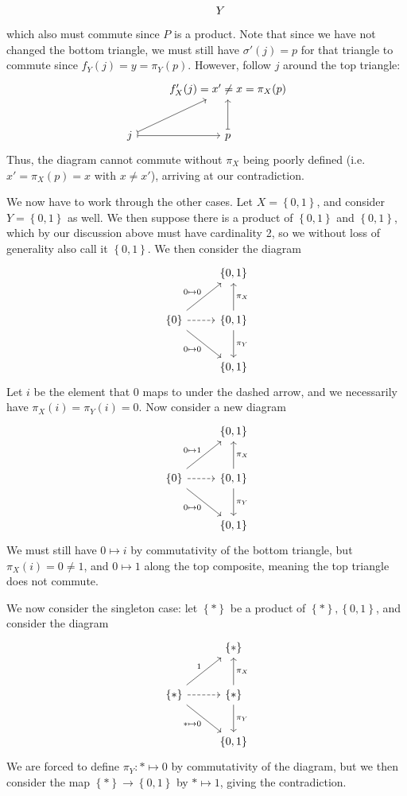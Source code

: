 \documentclass[11pt, letterpaper]{article}
\begin{document}
\begin{enumerate}
\[\begin{tikzcd}[row sep = 2.5em, column sep = 2.5em]
		 & Y
		\end{tikzcd}\]
		which also must commute since $P$ is a product. Note that since we have not changed the bottom triangle, we must still have $\sigma '(j)=p$ for that triangle to commute since $f_Y(j)=y=\pi _Y(p)$. However, follow $j$ around the top triangle:
		\[\begin{tikzcd}[row sep = 2.5em, column sep = 2.5em]
		 & f'_X(j)=x'\neq x=\pi _X(p)  \\
		j \ar[ur, mapsto] \ar[r, mapsto]  & p\ar[u, mapsto] 
		\end{tikzcd}\]
		Thus, the diagram cannot commute without $\pi _X$ being poorly defined (i.e. $x'=\pi _X(p)=x$ with $x\neq x'$), arriving at our contradiction.

		We now have to work through the other cases. Let $X=\left\{ 0,1 \right\} $, and consider $Y=\left\{ 0,1 \right\} $ as well. We then suppose there is a product of $\left\{ 0,1 \right\} $ and $\left\{ 0,1 \right\} $, which by our discussion above must have cardinality 2, so we without loss of generality also call it $\left\{ 0,1 \right\} $. We then consider the diagram
		\[\begin{tikzcd}[row sep = 2.5em, column sep = 2.5em]
		 & \left\{ 0,1 \right\}  \\
		\left\{ 0 \right\} \ar[" 0\mapsto 0 ", ur] \ar[" 0\mapsto 0 "', dr] \ar[dashed, r]  & \left\{ 0,1 \right\} \ar[u, " \pi _X "'] \ar[" \pi _Y ", d]  \\
		 & \left\{ 0,1 \right\} 
		\end{tikzcd}\]
		Let $i$ be the element that $0$ maps to under the dashed arrow, and we necessarily have $\pi _X(i)=\pi _Y(i)=0$. Now consider a new diagram
		\[\begin{tikzcd}[row sep = 2.5em, column sep = 2.5em]
		 & \left\{ 0,1 \right\}  \\
		\left\{ 0 \right\} \ar[" 0\mapsto 1 ", ur] \ar[" 0\mapsto 0 "', dr] \ar[dashed, r]  & \left\{ 0,1 \right\} \ar[u, " \pi _X "'] \ar[" \pi _Y ", d]  \\
		 & \left\{ 0,1 \right\} 
		\end{tikzcd}\]
		We must still have $0\mapsto i$ by commutativity of the bottom triangle, but $\pi _X(i)=0 \neq 1$, and $0\mapsto 1$ along the top composite, meaning the top triangle does not commute.

		We now consider the singleton case: let $\left\{ * \right\} $ be a product of $\left\{ * \right\} ,\left\{ 0,1 \right\} $, and consider the diagram
		\[\begin{tikzcd}[row sep = 2.5em, column sep = 2.5em]
		 & \left\{ * \right\}  \\
		\left\{ * \right\} \ar[" 1 ", ur] \ar[" *\mapsto 0 "', dr] \ar[dashed, r]  & \left\{ * \right\} \ar[" \pi _X "', u] \ar[" \pi _Y ", d]  \\
		 & \left\{ 0,1 \right\} 
		\end{tikzcd}\]
		We are forced to define $\pi _Y : * \mapsto 0$ by commutativity of the diagram, but we then consider the map $\left\{ * \right\} \to \left\{ 0,1 \right\} $ by $*\mapsto 1$, giving the contradiction.


\end{enumerate}
\end{document}
